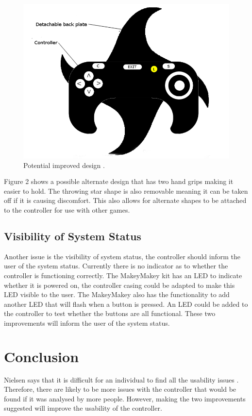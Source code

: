 \documentclass{scrartcl}
\begin{document}
\begin{figure}[h]
	\includegraphics[width=1.0\linewidth]{Improved_design.png}
	\caption{Potential improved design .}
\end{figure}

 Figure 2 shows a possible alternate design that has two hand grips making it easier to hold. The throwing star shape is also removable meaning it can be taken off if it is causing discomfort. This also allows for alternate shapes to be attached to the controller for use with other games. 

\subsection{Visibility of System Status}
Another issue is the visibility of system status, the controller should inform the user of the system status. Currently there is no indicator as to whether the controller is functioning correctly. The MakeyMakey kit has an LED to indicate whether it is powered on, the controller casing could be adapted to make this LED visible to the user. The MakeyMakey also has the functionality to add another LED that will flash when a button is pressed. An LED could be added to the controller to test whether the buttons are all functional. These two improvements will inform the user of the system status. 
\break
\section{Conclusion}
Nielsen says that it is difficult for an individual to find all the usability issues  \cite{HeuristicEvaluation}. Therefore, there are likely to be more issues with the controller that would be found if it was analysed by more people. However, making the two improvements suggested will improve the usability of the controller.




	
\end{document}
